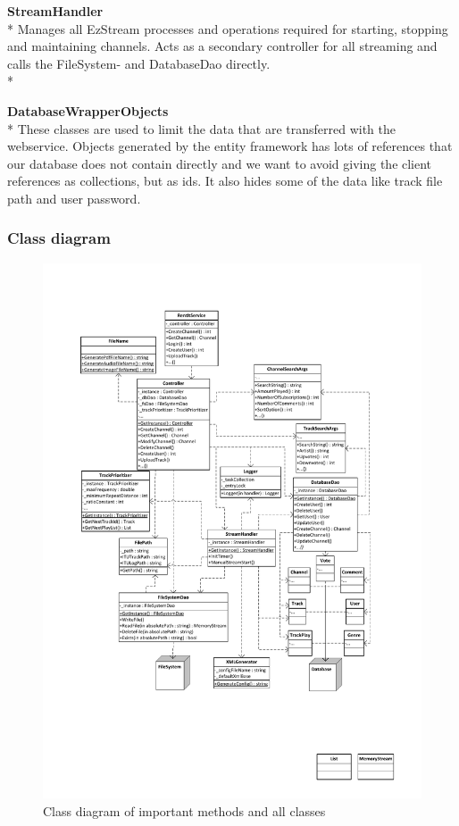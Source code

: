 \documentclass[a4paper,11pt,report]{article}
\begin{document}
\textbf{StreamHandler} \\*
Manages all EzStream processes and operations required for starting, stopping and maintaining channels. Acts as a secondary controller for all streaming and calls the FileSystem- and DatabaseDao directly. \\*

\textbf{DatabaseWrapperObjects} \\*
These classes are used to limit the data that are transferred with the webservice. Objects generated by the entity framework has lots of references that our database does not contain directly and we want to avoid giving the client references as collections, but as ids. It also hides some of the data like track file path and user password.

\subsubsection{Class diagram}
\begin{figure}[H]
  \centering
\includegraphics[width=400pt,keepaspectratio=true,trim=80pt 170pt 80pt 50pt]{./ClassDiagramv2.pdf}
\caption{Class diagram of important methods and all classes}
\end{figure}
\end{document}
